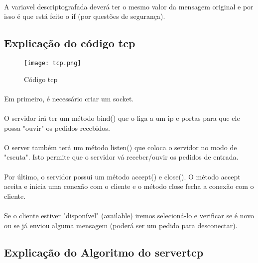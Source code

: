 \documentclass[a4paper,11pt,onecolumn,oneside]{article}
\begin{document}
\paragraph{ }
A variavel descriptografada  deverá ter o mesmo valor da mensagem original e por isso é que está feito o if (por questões de segurança).

\newpage
\subsection{Explicação do código tcp}

\begin{figure} [h]
\center
\texttt{[image: tcp.png]}
\caption{Código tcp}
\label{tcp}
\end{figure}

\paragraph{ }
Em primeiro, é necessário criar um socket.
\paragraph{ }
O servidor irá ter um método bind() que o liga a um \ac{ip} e portas para que ele possa "ouvir" os pedidos recebidos. 
\paragraph{ }
O server também terá um método listen() que coloca o servidor no modo de "escuta". Isto permite que o servidor vá receber/ouvir os pedidos de entrada. 
\paragraph{ }
Por último, o servidor possui um método accept() e close(). O método accept aceita e inicia uma conexão com o cliente e o método close fecha a conexão com o cliente.
\paragraph{ }
Se o cliente estiver "disponível" (available) iremos selecioná-lo e verificar se é novo ou se já enviou alguma mensagem (poderá ser um pedido para desconectar).


\newpage
\subsection{Explicação do Algoritmo do server\textunderscore tcp}
\end{document}
